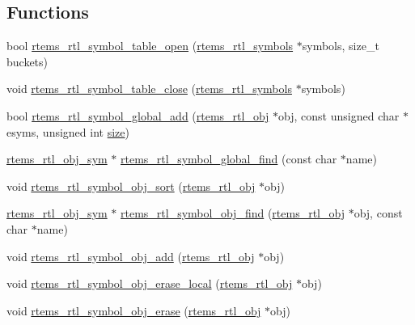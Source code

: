 \subsection*{Functions}
\begin{DoxyCompactItemize}
\item 
bool \mbox{\hyperlink{rtl-sym_8c_a833c85e22a03d0c816411f6b88ea5bbf}{rtems\+\_\+rtl\+\_\+symbol\+\_\+table\+\_\+open}} (\mbox{\hyperlink{structrtems__rtl__symbols}{rtems\+\_\+rtl\+\_\+symbols}} $\ast$symbols, size\+\_\+t buckets)
\item 
void \mbox{\hyperlink{rtl-sym_8c_ac18c51aca9023a082b359e672c8838e6}{rtems\+\_\+rtl\+\_\+symbol\+\_\+table\+\_\+close}} (\mbox{\hyperlink{structrtems__rtl__symbols}{rtems\+\_\+rtl\+\_\+symbols}} $\ast$symbols)
\item 
bool \mbox{\hyperlink{rtl-sym_8c_acfcaf459050499e3ba535d8f17b1cac7}{rtems\+\_\+rtl\+\_\+symbol\+\_\+global\+\_\+add}} (\mbox{\hyperlink{structrtems__rtl__obj}{rtems\+\_\+rtl\+\_\+obj}} $\ast$obj, const unsigned char $\ast$esyms, unsigned int \mbox{\hyperlink{sun4u_2tte_8h_a245260f6f74972558f61b85227df5aae}{size}})
\item 
\mbox{\hyperlink{structrtems__rtl__obj__sym}{rtems\+\_\+rtl\+\_\+obj\+\_\+sym}} $\ast$ \mbox{\hyperlink{rtl-sym_8c_a2e0a774381e2d7d9597a88b1688741d3}{rtems\+\_\+rtl\+\_\+symbol\+\_\+global\+\_\+find}} (const char $\ast$name)
\item 
void \mbox{\hyperlink{rtl-sym_8c_a450818df431a0b6254e933f45497c281}{rtems\+\_\+rtl\+\_\+symbol\+\_\+obj\+\_\+sort}} (\mbox{\hyperlink{structrtems__rtl__obj}{rtems\+\_\+rtl\+\_\+obj}} $\ast$obj)
\item 
\mbox{\hyperlink{structrtems__rtl__obj__sym}{rtems\+\_\+rtl\+\_\+obj\+\_\+sym}} $\ast$ \mbox{\hyperlink{rtl-sym_8c_a98e04c5083c6560c69802ee44b839459}{rtems\+\_\+rtl\+\_\+symbol\+\_\+obj\+\_\+find}} (\mbox{\hyperlink{structrtems__rtl__obj}{rtems\+\_\+rtl\+\_\+obj}} $\ast$obj, const char $\ast$name)
\item 
void \mbox{\hyperlink{rtl-sym_8c_abd7450ebf4df51019720c76de3823460}{rtems\+\_\+rtl\+\_\+symbol\+\_\+obj\+\_\+add}} (\mbox{\hyperlink{structrtems__rtl__obj}{rtems\+\_\+rtl\+\_\+obj}} $\ast$obj)
\item 
void \mbox{\hyperlink{rtl-sym_8c_a02b3a4ba7169bb4f243a5be15b301391}{rtems\+\_\+rtl\+\_\+symbol\+\_\+obj\+\_\+erase\+\_\+local}} (\mbox{\hyperlink{structrtems__rtl__obj}{rtems\+\_\+rtl\+\_\+obj}} $\ast$obj)
\item 
void \mbox{\hyperlink{rtl-sym_8c_adf65b8fa73ea388857082a79e437767a}{rtems\+\_\+rtl\+\_\+symbol\+\_\+obj\+\_\+erase}} (\mbox{\hyperlink{structrtems__rtl__obj}{rtems\+\_\+rtl\+\_\+obj}} $\ast$obj)
\end{DoxyCompactItemize}


